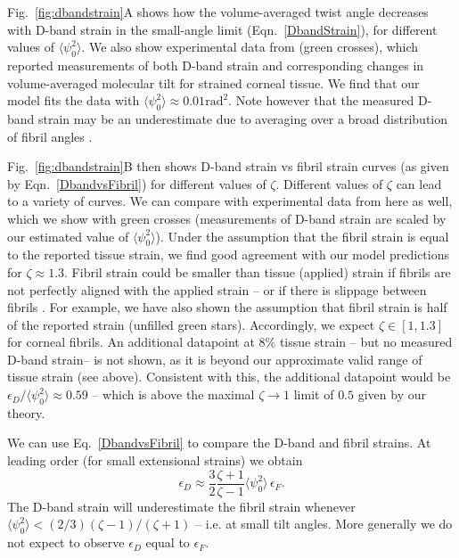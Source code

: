 \documentclass[preprint,12pt]{elsarticle}
\begin{document}
Fig.~\ref{fig:dbandstrain}A shows how the volume-averaged twist angle decreases with D-band strain in the small-angle limit (Eqn.~\ref{DbandStrain}), for different values of $\langle\psi_0^2\rangle$. We also show experimental data from \cite{Bell:2018} (green crosses), which reported measurements of both D-band strain and corresponding changes in volume-averaged molecular tilt for strained corneal tissue. We find that our model  fits the data with $\langle\psi_0^2\rangle\approx 0.01\mathrm{rad}^2$. Note however that the measured D-band strain may be an underestimate due to averaging over a broad distribution of fibril angles \cite{Bell:2018}.

Fig.~\ref{fig:dbandstrain}B then shows D-band strain vs fibril strain curves (as given by Eqn.~\ref{DbandvsFibril}) for different values of $\zeta$. Different values of $\zeta$ can lead to a variety of curves. We can compare with experimental data from \cite{Bell:2018} here as well, which we show with green crosses (measurements of D-band strain are  scaled by our estimated value of $\langle\psi_0^2\rangle$). Under the assumption that the fibril strain is equal to the reported tissue strain, we find good agreement with our model predictions for $\zeta\approx1.3$. Fibril strain could be smaller than tissue (applied) strain if fibrils are not perfectly aligned with the applied strain -- or if there is  slippage between fibrils \cite{Gupta:2010, Puxkandl:2002}. For example, we have also shown the assumption that fibril strain is half of the reported strain (unfilled green stars). Accordingly, we expect $\zeta\in[1,1.3]$ for corneal fibrils. An additional datapoint at $8\%$ tissue strain -- but no measured D-band strain-- is not shown, as it is beyond our approximate valid range of tissue strain (see above). Consistent with this, the additional datapoint would be $\epsilon_D/\langle \psi_0^2 \rangle \approx 0.59$ -- which is above the maximal $\zeta \rightarrow 1$ limit of $0.5$ given by our theory. 

We can use Eq.~\ref{DbandvsFibril} to compare the D-band and fibril strains. At leading order (for small extensional strains) we obtain 
\begin{equation}
    \epsilon_D \approx \frac{3}{2} \frac{\zeta+1}{\zeta-1} \langle \psi_0^2 \rangle \, \epsilon_F.
\end{equation}
The D-band strain will underestimate the fibril strain whenever $\langle\psi_0^2\rangle <(2/3) (\zeta-1)/(\zeta+1)$ -- i.e. at small tilt angles. More generally we do not expect to observe $\epsilon_D$ equal to $\epsilon_F$. 
\end{document}
